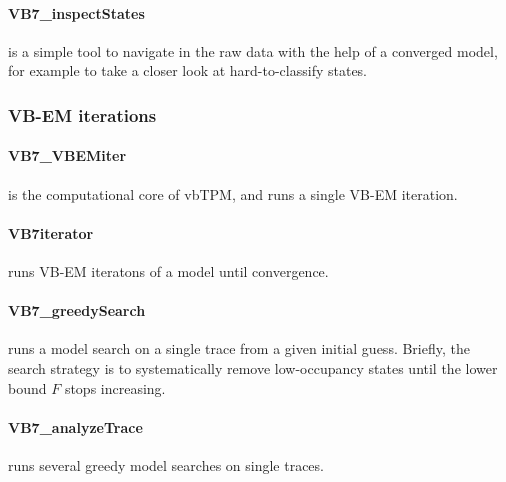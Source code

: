 \paragraph{VB7\_inspectStates} 
is a simple tool to navigate in the raw data with the help of a
converged model, for example to take a closer look at hard-to-classify
states.

\subsubsection{VB-EM iterations}
\paragraph{VB7\_VBEMiter} 
is the computational core of vbTPM, and runs a single VB-EM iteration.
\paragraph{VB7iterator} 
runs VB-EM iteratons of a model until convergence.
\paragraph{VB7\_greedySearch}
runs a model search on a single trace from a given initial
guess. Briefly, the search strategy is to systematically remove
low-occupancy states until the lower bound $F$ stops increasing.
\paragraph{VB7\_analyzeTrace}
runs several greedy model searches on single traces. 

